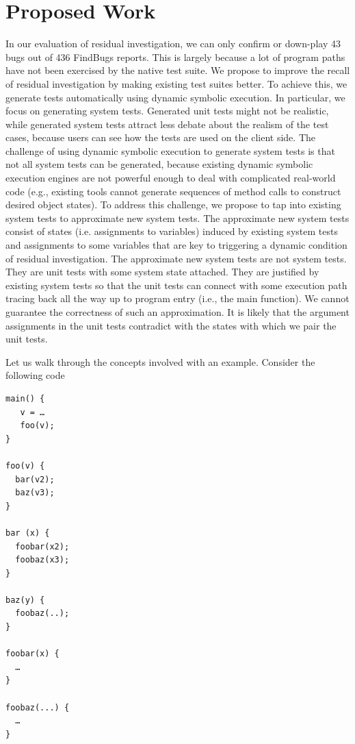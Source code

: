 \documentclass[proposal]{umthesis} %
\begin{document}
  
\chapter{Proposed Work}
\label{chp:proposed}

In our evaluation of residual investigation, we can only confirm or down-play 43 bugs out of 436 FindBugs reports. This is largely because a lot of program paths have not been exercised by the native test suite. We propose to improve the recall of residual investigation by making existing test suites better. To achieve this, we generate tests automatically using dynamic symbolic execution.  In particular, we focus on generating system tests. Generated unit tests might not be realistic, while generated system tests attract less debate about the realism of the test cases, because users can see how the tests are used on the client side.  The challenge of using dynamic symbolic execution to generate system tests is that not all system tests can be generated, because existing dynamic symbolic execution engines are not powerful enough to deal with complicated real-world code (e.g., existing tools cannot generate sequences of method calls to construct desired object states)\cite{Xiao:2011:PIP:1985793.1985876}.  To address this challenge, we propose to tap into existing system tests to approximate new system tests. The approximate new system tests consist of  states (i.e. assignments to variables) induced by existing system tests and assignments to some variables that are key to triggering a dynamic condition of residual investigation.  The approximate new system tests are not system tests.  They are unit tests with some system state attached.  They are justified by existing system tests so that the unit tests can connect with some execution path tracing back all the way up to program entry (i.e., the main function).  We cannot guarantee the correctness of such an approximation. It is likely that the argument assignments in the unit tests contradict with the states with which we pair the unit tests.  

Let us walk through the concepts involved with an example. Consider the following code
\begin{small}
\begin{verbatim}
main() {
   v = …
   foo(v);
}

foo(v) {
  bar(v2);
  baz(v3);
}

bar (x) {
  foobar(x2);
  foobaz(x3);
}

baz(y) {
  foobaz(..);
}

foobar(x) {
  …
}

foobaz(...) {
  …
}
\end{verbatim}
\end{small}
\end{document}
